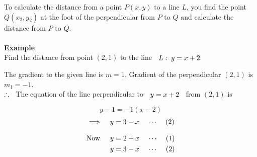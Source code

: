 \documentclass[11pt,a4paper]{article}
\begin{document}
To calculate the distance from a point $P(x,y)$ to a line $L$, you find the point $Q(x_2,y_2)$ at the foot of the perpendicular from $P$ to $Q$ and calculate the distance from $P$ to $Q$.\\\\





\textbf{Example}\\
Find the distance from point $(2,1)$ to the line $\hspace{0.2cm} L :\hspace{0.1cm} y = x + 2$

\begin{figure}[H]
\centering
{}
\end{figure}













The gradient to the given line is $m = 1$. Gradient of the perpendicular $(2,1)$ is $m_1 = -1$.\\

$\therefore\hspace{0.2cm}$ The equation of the line perpendicular to $\hspace{0.2cm} y = x + 2\hspace{0.2cm}$ from $(2,1)$ is
  
$$y - 1 = -1(x -2)$$
$$\implies \hspace{0.3cm} y = 3 - x \hspace{0.4cm}\cdots\hspace{0.4cm} (2)$$

\begin{align*}
\text{Now}\hspace{0.5cm} y & = 2 + x \hspace{0.4cm}\cdots \hspace{0.4cm} (1)\\
y & = 3 - x \hspace{0.4cm}\cdots \hspace{0.4cm} (2)
\end{align*}
\end{document}

